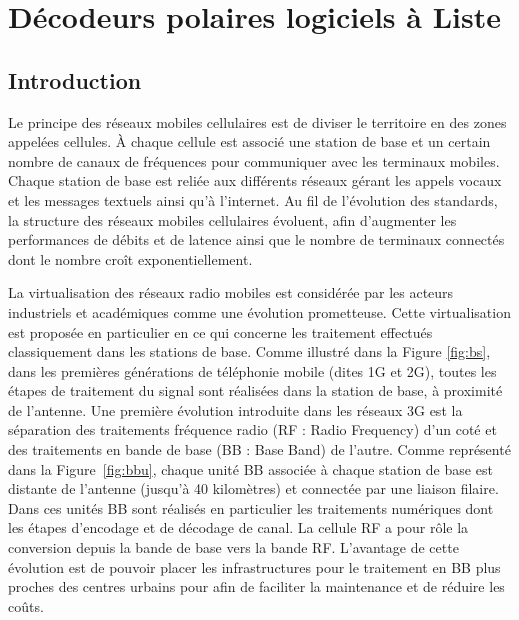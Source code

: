\chapter{Décodeurs polaires logiciels à Liste} %


\vspace*{\fill}
\minitocTITI
\vspace*{\fill}
\newpage


\section{Introduction}

Le principe des réseaux mobiles cellulaires est de diviser le territoire en des zones appelées cellules. \`A chaque cellule est associé une station de base et un certain nombre de canaux de fréquences pour communiquer avec les terminaux mobiles. Chaque station de base est reliée aux différents réseaux gérant les appels vocaux et les messages textuels ainsi qu'à l'internet. Au fil de l'évolution des standards, la structure des réseaux mobiles cellulaires évoluent, afin d'augmenter les performances de débits et de latence ainsi que le nombre de terminaux connectés dont le nombre croît exponentiellement.

La virtualisation des réseaux radio mobiles est considérée par les acteurs industriels \cite{ericsson_cloud_2015,huawei_5g:_2013} et académiques \cite{wubben_benefits_2014,rost_cloud_2014,checko_cloud_2015} comme une évolution prometteuse. Cette virtualisation est proposée en particulier en ce qui concerne les traitement effectués classiquement dans les stations de base. Comme illustré dans la Figure \ref{fig:bs}, dans les premières générations de téléphonie mobile (dites 1G et 2G), toutes les étapes de traitement du signal sont réalisées dans la station de base, à proximité de l'antenne. Une première évolution introduite dans les réseaux 3G est la séparation des traitements fréquence radio (RF : Radio Frequency) d'un coté et des traitements en bande de base (BB : Base Band) de l'autre. Comme représenté dans la Figure~\ref{fig:bbu}, chaque unité BB associée à chaque station de base est distante de l'antenne (jusqu'à 40 kilomètres) et connectée par une liaison filaire. Dans ces unités BB sont réalisés en particulier les traitements numériques dont les étapes d'encodage et de décodage de canal. La cellule RF a pour rôle la conversion depuis la bande de base vers la bande RF. L'avantage de cette évolution est de pouvoir placer les infrastructures pour le traitement en BB plus proches des centres urbains pour afin de faciliter la maintenance et de réduire les coûts.

